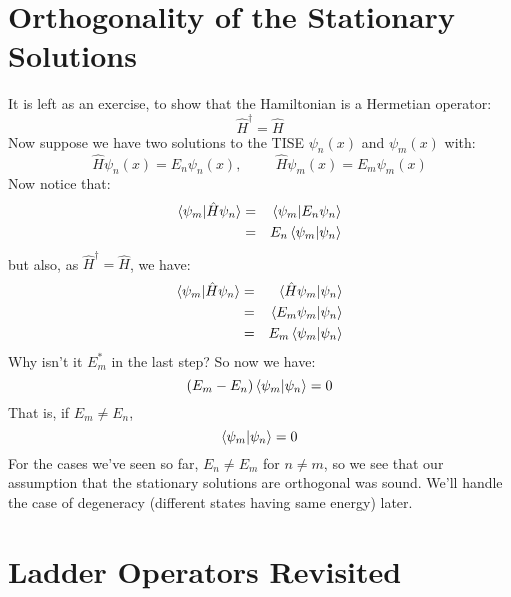 \documentclass[12pt]{book}
\begin{document}
\section{Orthogonality of the Stationary Solutions}
It is left as an exercise, to show that the Hamiltonian is a Hermetian operator:
$$\hat{H}^\dagger = \hat{H}$$
Now suppose we have two solutions to the TISE $\psi_n(x)$ and $\psi_m(x)$ with:
$$\hat{H}\psi_n(x) = E_n \psi_n(x), \hspace{1cm} \hat{H}\psi_m(x) = E_m \psi_m(x)$$
Now notice that:
\begin{eqnarray*}
\braket{\psi_m|\hat{H}\psi_n} &=& \braket{\psi_m|E_n\psi_n}\\
&=& E_n \braket{\psi_m|\psi_n}
\end{eqnarray*}
but also, as $\hat{H}^\dagger = \hat{H}$, we have:
\begin{eqnarray*}
\braket{\psi_m|\hat{H}\psi_n} &=& \braket{\hat{H}\psi_m|\psi_n}\\
&=& \braket{E_m\psi_m|\psi_n}\\
&=& E_m \braket{\psi_m|\psi_n}
\end{eqnarray*}
Why isn't it $E_m^*$ in the last step?  So now we have:
$$(E_m-E_n)\braket{\psi_m|\psi_n} = 0$$
That is, if $E_m \neq E_n$,
\begin{equation}
\braket{\psi_m|\psi_n} = 0
\end{equation}
For the cases we've seen so far, $E_n \neq E_m$ for $n \neq m$, so we see that our assumption that the stationary solutions are orthogonal was sound.  We'll handle the case of degeneracy (different states having same energy) later.

\section{Ladder Operators Revisited}
\end{document}
